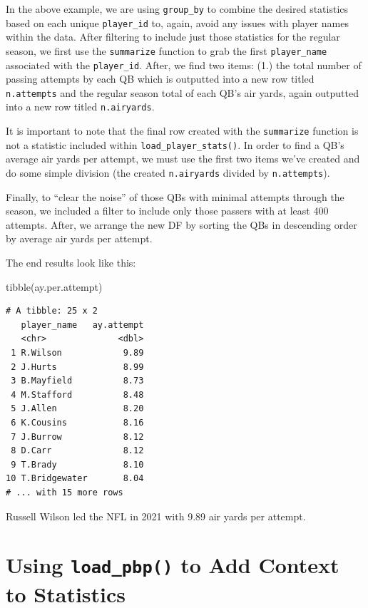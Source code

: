 \documentclass[
  letterpaper,
]{krantz}
\newenvironment{Shaded}{\begin{snugshade}}{\end{snugshade}}
\newcommand{\FunctionTok}[1]{\textcolor[rgb]{0.28,0.35,0.67}{#1}}
\newcommand{\NormalTok}[1]{\textcolor[rgb]{0.00,0.23,0.31}{#1}}
\begin{document}
In the above example, we are using \texttt{group\_by} to combine the
desired statistics based on each unique \texttt{player\_id} to, again,
avoid any issues with player names within the data. After filtering to
include just those statistics for the regular season, we first use the
\texttt{summarize} function to grab the first \texttt{player\_name}
associated with the \texttt{player\_id}. After, we find two items: (1.)
the total number of passing attempts by each QB which is outputted into
a new row titled \texttt{n.attempts} and the regular season total of
each QB's air yards, again outputted into a new row titled
\texttt{n.airyards}.

It is important to note that the final row created with the
\texttt{summarize} function is not a statistic included within
\texttt{load\_player\_stats()}. In order to find a QB's average air
yards per attempt, we must use the first two items we've created and do
some simple division (the created \texttt{n.airyards} divided by
\texttt{n.attempts}).

Finally, to ``clear the noise'' of those QBs with minimal attempts
through the season, we included a filter to include only those passers
with at least 400 attempts. After, we arrange the new DF by sorting the
QBs in descending order by average air yards per attempt.

The end results look like this:

\begin{Shaded}
\begin{Highlighting}[]
\FunctionTok{tibble}\NormalTok{(ay.per.attempt)}
\end{Highlighting}
\end{Shaded}

\begin{verbatim}
# A tibble: 25 x 2
   player_name   ay.attempt
   <chr>              <dbl>
 1 R.Wilson            9.89
 2 J.Hurts             8.99
 3 B.Mayfield          8.73
 4 M.Stafford          8.48
 5 J.Allen             8.20
 6 K.Cousins           8.16
 7 J.Burrow            8.12
 8 D.Carr              8.12
 9 T.Brady             8.10
10 T.Bridgewater       8.04
# ... with 15 more rows
\end{verbatim}

Russell Wilson led the NFL in 2021 with 9.89 air yards per attempt.

\hypertarget{using-load_pbp-to-add-context-to-statistics}{%
\section{\texorpdfstring{Using \texttt{load\_pbp()} to Add Context to
Statistics}{Using load\_pbp() to Add Context to Statistics}}\label{using-load_pbp-to-add-context-to-statistics}}
\end{document}
